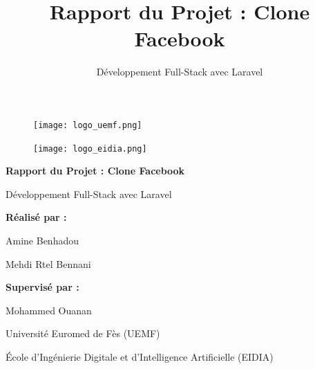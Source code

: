 \documentclass[12pt,a4paper]{article}
\title{\textbf{Rapport du Projet : Clone Facebook}}
\author{D\'eveloppement Full-Stack avec Laravel}
\date{}
\begin{document}
\begin{titlepage}
    \centering
    
    \begin{figure}[h]
        \centering
        \begin{minipage}{0.4\textwidth}
            \centering
            \texttt{[image: logo\_uemf.png]}
        \end{minipage}
        \hfill
        \begin{minipage}{0.4\textwidth}
            \centering
            \texttt{[image: logo\_eidia.png]}
        \end{minipage}
    \end{figure}
    
    \vspace{2cm}
    
    {\LARGE\textbf{Rapport du Projet : Clone Facebook}\par}
    
    \vspace{1cm}
    
    {\large D\'eveloppement Full-Stack avec Laravel\par}
    
    \vspace{3cm}
    
    {\large\textbf{R\'ealis\'e par :}\par}
    \vspace{0.5cm}
    {\large Amine Benhadou\par}
    {\large Mehdi Rtel Bennani\par}
    
    \vspace{1.5cm}
    
    {\large\textbf{Supervis\'e par :}\par}
    \vspace{0.5cm}
    {\large Mohammed Ouanan\par}
    
    \vfill
    
    {\large Universit\'e Euromed de F\`es (UEMF)\par}
    {\large \'Ecole d'Ing\'enierie Digitale et d'Intelligence Artificielle (EIDIA)\par}
    
\end{titlepage}
\newpage

\tableofcontents
\newpage
\end{document}
